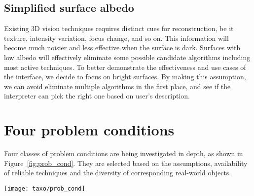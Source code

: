 \subsection{Simplified surface albedo}
Existing 3D vision techniques requires distinct cues for reconstruction, be it texture, intensity variation, focus change, and so on. This information will become much noisier and less effective when the surface is dark. Surfaces with low albedo will effectively eliminate some possible candidate algorithms including most active techniques. To better demonstrate the effectiveness and use cases of the interface, we decide to focus on bright surfaces. By making this assumption, we can avoid eliminate multiple algorithms in the first place, and see if the interpreter can pick the right one based on user's description.

\section{Four problem conditions}
Four classes of problem conditions are being investigated in depth, as shown in Figure~\ref{fig:prob_cond}. They are selected based on the assumptions, availability of reliable techniques and the diversity of corresponding real-world objects.
\begin{figure*}[!htbp]
\centering
\texttt{[image: taxo/prob\_cond]}
\caption{Four classes of problem conditions of interest with the proposed label.}
\label{fig:prob_cond}
\end{figure*}